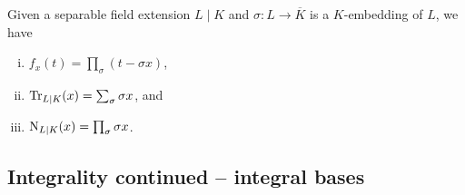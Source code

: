 \begin{proposition}
	Given a separable field extension $L\mid K$ and $\sigma : L\to\overline{K}$ is a $K$-embedding of $L$, we have
	\begin{enumerate}[(i)]
		\item $f_x(t)= \prod_\sigma(t-\sigma x)$,
		\item $\operatorname{Tr}_{L\mid K}(x) = \sum_\sigma \sigma x$, and
		\item $\operatorname{N}_{L\mid K}(x) = \prod_\sigma \sigma x$.
	\end{enumerate}
\end{proposition}





\subsection{Integrality continued -- integral bases}
